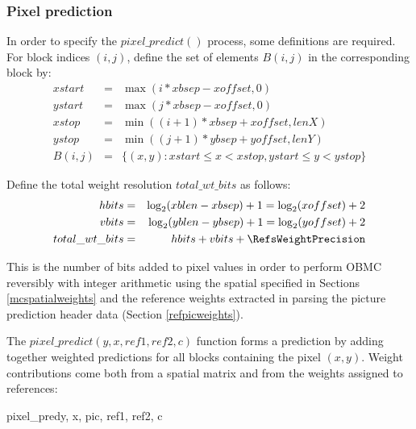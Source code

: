 \subsubsection{Pixel prediction}
\label{pixelpredict}

In order to specify the $pixel\_predict()$ process, some definitions are required. For block indices $(i,j)$, 
define the set of elements $B(i,j)$ in the corresponding
block by:
\begin{eqnarray*}
xstart & = & \max(i*xbsep-xoffset, 0) \\
ystart & = & \max(j*xbsep-xoffset, 0) \\
xstop & = & \min\left( (i+1)*xbsep+xoffset, lenX\right)\\
ystop & = & \min\left( (j+1)*ybsep+yoffset, lenY\right)\\
B(i,j) & = & \{(x,y): xstart\leq x<xstop, ystart\leq y<ystop\}
\end{eqnarray*}

Define the total weight resolution $total\_wt\_bits$ as follows: 
\begin{eqnarray*}
hbits  & = & \log_2(xblen-xbsep)+1 = \log_2(xoffset)+2 \\
vbits  & = & \log_2(yblen-ybsep)+1 = \log_2(yoffset)+2 \\
total\_wt\_bits & = & hbits+vbits+\RefsWeightPrecision
\end{eqnarray*}

This is the number of bits added to pixel values in order to perform OBMC 
reversibly with integer arithmetic using the spatial specified in Sections 
\ref{mcspatialweights} and the reference weights extracted in
parsing the picture prediction header data (Section \ref{refpicweights}).

The $pixel\_predict(y, x, ref1, ref2, c)$ function forms a prediction by adding together weighted predictions
for all blocks containing the pixel $(x,y)$. Weight contributions come both from a spatial matrix and from the
weights assigned to references:

\begin{pseudo}{pixel\_pred}{y, x, pic, ref1, ref2, c}
   \bsELSE
    \bsEND{}
\bsEND
{}
\end{pseudo}


